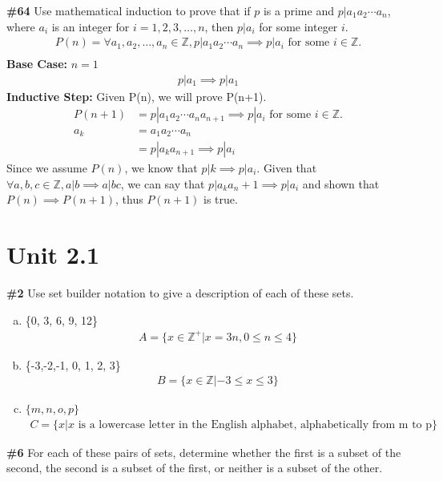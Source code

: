 \documentclass{article}
\newcommand{\unit}[1]{\section{Unit #1}}
\newcommand{\problem}[1]{\textbf{\##1}}
\newcommand{\prob}[1]{\problem{#1}}
\newcommand{\AllIntegers}{\mathbb{Z}}
\begin{document}
\pagebreak
\prob{64}
Use mathematical induction to prove that if \(p\) is a prime and \(p | a_1a_2 \cdots a_n\), where \(a_i\) is an integer for \(i = 1, 2, 3, \dots , n\), then \(p | a_i\) for some integer \(i\). 
\begin{align*}
    P(n) = \forall a_1, a_2, \dots, a_n \in \AllIntegers, p | a_1a_2 \cdots a_n \implies p | a_i \text{ for some } i \in \AllIntegers .\\
\end{align*}
\textbf{Base Case:} \(n=1\)
\begin{align*}
    p | a_1 \implies p | a_1
\end{align*}
\textbf{Inductive Step:} Given P(n), we will prove P(n+1).
\begin{align*}
    P(n+1) &= p|a_1a_2\cdots a_na_{n+1} \implies p|a_i \text{ for some } i \in \AllIntegers .\\
    a_k &= a_1a_2\cdots a_n\\
    &= p|a_ka_{n+1} \implies p|a_i
\end{align*}
Since we assume \(P(n)\), we know that \(p|k \implies p|a_i\). Given that \(\forall a,b,c \in \AllIntegers, a|b \implies a|bc\), we can say that \(p|a_ka_n+1 \implies p|a_i\) and shown that \(P(n) \implies P(n+1)\), thus \(P(n+1)\) is true.
\pagebreak
\unit{2.1} 
\prob{2} Use set builder notation to give a description of each of these sets.
\begin{enumerate}[a)]
    \item \{{0, 3, 6, 9, 12}\}\\
    \begin{align*}
        A = \{x \in \AllIntegers^+ | x = 3n, 0 \leq n \leq 4\}
    \end{align*}
    \item \{{-3,-2,-1, 0, 1, 2, 3}\}
    \begin{align*}
        B = \{x \in \AllIntegers | -3 \leq x \leq 3\}
    \end{align*}
    \item \(\{m,n,o,p\}\)
    \begin{align*}
        C = \{x | x \text{ is a lowercase letter in the English alphabet, alphabetically from m to p}\}
    \end{align*}
\end{enumerate}
\pagebreak
\prob{6} For each of these pairs of sets, determine whether the first is a subset of the second, the second is a subset of the first, or neither is a subset of the other.
\end{document}

